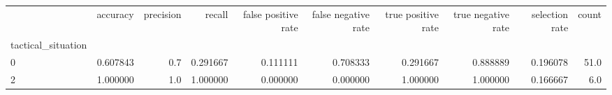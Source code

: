 \begin{tabular}{lrrrrrrrrr}
\toprule
{} &  accuracy &  precision &    recall &  false positive rate &  false negative rate &  true positive rate &  true negative rate &  selection rate &  count \\
tactical\_situation &           &            &           &                      &                      &                     &                     &                 &        \\
\midrule
0                  &  0.607843 &        0.7 &  0.291667 &             0.111111 &             0.708333 &            0.291667 &            0.888889 &        0.196078 &   51.0 \\
2                  &  1.000000 &        1.0 &  1.000000 &             0.000000 &             0.000000 &            1.000000 &            1.000000 &        0.166667 &    6.0 \\
\bottomrule
\end{tabular}
